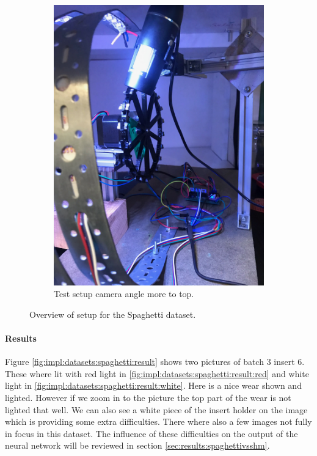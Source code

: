 \begin{figure}[hbtp]
\begin{subfigure}{0.4\textwidth}
		\includegraphics[width=\linewidth, keepaspectratio=true,angle=270]{./fig/Vision/Dataset/automated_datasets/2_created_datasets/2_Spaghetti_dataset/IMG_9296.jpeg}
		\caption{Test setup camera angle more to top.}
		\label{fig:impl:sd:setup:top}
	\end{subfigure}
	\hspace*{\fill}
	\caption{Overview of setup for the Spaghetti dataset.}
\end{figure}

\begin{figure}[hbtp]
\centering
	
\end{figure}



\paragraph{Results}

Figure \ref{fig:impl:datasets:spaghetti:result} shows two pictures of batch 3 insert 6. These where lit with red light in \ref{fig:impl:datasets:spaghetti:result:red} and white light in \ref{fig:impl:datasets:spaghetti:result:white}. Here is a nice wear shown and lighted. However if we zoom in to the picture the top part of the wear is not lighted that well. We can also see a white piece of the insert holder on the image which is providing some extra difficulties. There where also a few images not fully in focus in this dataset. The influence of these difficulties on the output of the neural network will be reviewed in section \ref{sec:results:spaghettivsshm}.

